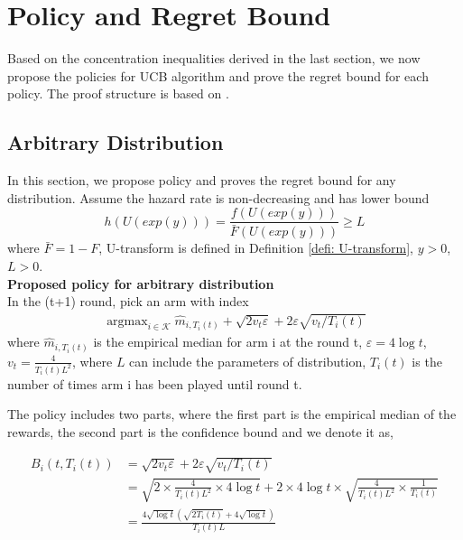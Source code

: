 \documentclass{article}
\DeclareMathOperator*{\argmax}{argmax}
\theoremstyle{plain}
\begin{document}

\section{Policy and Regret Bound}

Based on the concentration inequalities derived in the last section, we now propose the policies for UCB algorithm and prove the regret bound for each policy. The proof structure is based on \cite{Auer2002}.

\subsection{Arbitrary Distribution}

In this section, we propose policy and proves the regret bound for any distribution. Assume the hazard rate is non-decreasing and has lower bound
$$h\left(U(exp(y))\right) = \frac{f\left(U(exp(y))\right)}{\bar{F}\left(U(exp(y))\right) } \geq L$$
where $\bar{F} = 1 - F$, U-transform is defined in Definition \ref{defi: U-transform}, $y > 0$, $L > 0$. \\

\textbf{Proposed policy for arbitrary distribution}\\

In the (t+1) round, pick an arm with index
\begin{align}
   \label{policy abr}
   \argmax_{i \in \mathcal{K}} \hat{m}_{i, T_i(t)} + \sqrt{2v_t \varepsilon} + 2 \varepsilon \sqrt{v_t/T_i(t)}
\end{align}
where $\hat{m}_{i, T_i(t)}$ is the empirical median for arm i at the round t, $\varepsilon = 4 \log t$, $v_t = \frac{4 }{T_i(t) L^2}$, where $L$ can include the parameters of distribution, $T_i(t)$ is the number of times arm i has been played until round t.

The policy includes two parts, where the first part is the empirical median of the rewards, the second part is the confidence bound and we denote it as,

\begin{align}
\label{B_i(i, T_i(t)) definition for arb}
B_i(t, T_i(t)) &= \sqrt{2v_t \varepsilon} + 2 \varepsilon \sqrt{v_t/T_i(t)}\\
&= \sqrt{2 \times \frac{4 }{T_i(t) L^2} \times 4 \log t} + 2 \times 4 \log t \times \sqrt{\frac{4 }{T_i(t) L^2} \times \frac{1}{T_i(t)}}\\
&= \frac{4 \sqrt{\log t} ( \sqrt{ 2T_i(t)} + 4\sqrt{\log t})}{T_i(t) L}
\end{align}
\end{document}
